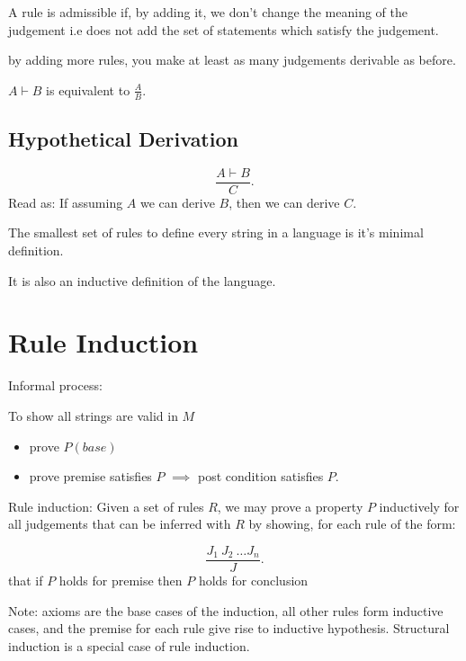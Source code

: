 \begin{definition}
 A rule is admissible if, by adding it, we don't change the meaning of the judgement i.e does not add the set of statements which satisfy the judgement.
\end{definition}

\begin{definition}
  by adding more rules, you make at least as many judgements derivable as before.
\end{definition}

\begin{notation}
 \( A \vdash B\) is equivalent to \(  \frac{A}{B} \).
\end{notation}
\subsection{Hypothetical Derivation}

\[
  \frac{A \vdash B}{C}
.\] 
Read as: If assuming \( A \) we can derive \( B \), then we can derive \( C \).

\begin{definition}
  The smallest set of rules to define every string in a language is it's minimal definition.
\end{definition}

It is also an inductive definition of the language.

\section{Rule Induction}

Informal process:

To show all strings are valid in \( M \)

\begin{itemize}
  \item prove \( P(base) \)
  \item prove premise satisfies \( P \) \( \implies \) post condition satisfies \( P \).
\end{itemize}

\begin{definition}
  Rule induction: Given a set of rules $R$, we may prove a property $P$ inductively for
all judgements that can be inferred with $R$ by showing, for each
rule of the form:

\[
  \frac{J_1 \: J_2 \: \ldots J_n }{J}
.\] 
that if \( P \) holds for premise then \( P \) holds for conclusion
\end{definition}

Note: axioms are the base cases of the induction, all other rules form
inductive cases, and the premise for each rule give rise to inductive hypothesis.
\newline
Structural induction is a special case of rule induction.



